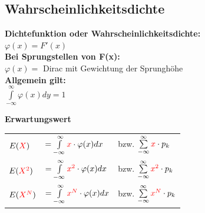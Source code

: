 \subsection{Wahrscheinlichkeitsdichte \skript{\pageref{sk-bildstetigeverteilungsfunktion}}}
\begin{multicols}{2}
\textbf{Dichtefunktion oder Wahrscheinlichkeitsdichte:} \\
$\varphi(x) = F'(x)$ \\
\textbf{Bei Sprungstellen von F(x):} \\
$\varphi(x) = $ Dirac mit Gewichtung der Sprunghöhe\\
\textbf{Allgemein gilt:}\\
$\int\limits_{-\infty}^{\infty}\varphi (x) dy = 1$

\columnbreak

	\textbf{Erwartungswert} \\
	\begin{tabular}{l l l}
		$E(\textcolor{red}{X})$ &  
    $ = \int\limits_{-\infty}^{\infty} \textcolor{red}{x} \cdot \varphi(x) dx$  & 
    bzw. $\sum\limits_{-\infty}^{\infty} \textcolor{red}{x} \cdot p_k$\\
    
		$E(\textcolor{red}{X^2})$ & 
    $ = \int\limits_{-\infty}^{\infty} \textcolor{red}{x^2} \cdot \varphi(x) dx$ & 
    bzw. $\sum\limits_{-\infty}^{\infty} \textcolor{red}{x^2} \cdot p_k$\\
    
		$E(\textcolor{red}{X^N})$ & 
    $ = \int\limits_{-\infty}^{\infty} \textcolor{red}{x^N} \cdot \varphi(x) dx$ 
    & bzw. $\sum\limits_{-\infty}^{\infty} \textcolor{red}{x^N} \cdot p_k$
	\end{tabular}
\end{multicols}


